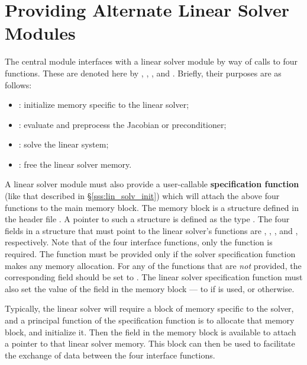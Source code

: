 \chapter{Providing Alternate Linear Solver Modules}\label{s:new_linsolv}
The central {\kinsol} module interfaces with a linear solver module 
by way of calls to four functions.  These are denoted here by 
, , , and .
Briefly, their purposes are as follows:
\begin{itemize}
\item {}: initialize memory specific to the linear solver;
\item {}: evaluate and preprocess the Jacobian or preconditioner;
\item {}: solve the linear system;
\item {}: free the linear solver memory.
\end{itemize}
A linear solver module must also provide a user-callable {\bf specification function}
(like that described in \S\ref{sss:lin_solv_init}) which will
attach the above four functions to the main {\kinsol} memory block.
The {\kinsol} memory block is a structure defined in the header file
. A pointer to such a structure is defined as the
type . The four fields in a  structure that
must point to the linear solver's functions are ,
, , and , respectively.
Note that of the four interface functions, only the  function
is required. The  function must be provided only if the solver
specification function makes any memory allocation.
For any of the functions that are {\it not} provided, the
corresponding field should be set to .
The linear solver specification function must also set the value of
the field  in the {\kinsol} memory block --- to
 if  is used, or  otherwise.

Typically, the linear solver will require a block of memory specific
to the solver, and a principal function of the specification function
is to allocate that memory block, and initialize it.  Then the field
 in the {\kinsol} memory block is available to attach a
pointer to that linear solver memory.  This block can then be used
to facilitate the exchange of data between the four interface
functions.

